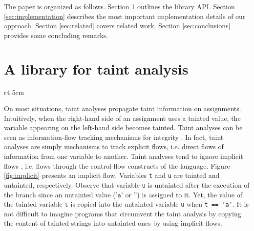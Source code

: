 \documentclass[oribibl]{llncs}
\begin{document}
  

 
The paper is organized as follows.
Section \ref{sec:library} outlines the library API.
Section \ref{sec:implementation} 
describes the most important implementation details of our approach.
Section \ref{sec:related} covers related work.  
Section \ref{sec:conclusions} provides some 
concluding remarks. 






\section{A library for taint analysis}
\label{sec:library}

\begin{wrapfigure}{r}{4.5cm}
\vspace{-30pt}
{\small{

\caption{\label{fig:implicit}An implicit flow}
}}
\vspace{-20pt}
\end{wrapfigure}



On most situations, taint analyses %
propagate 
taint information on assignments.  
Intuitively, when the right-hand side of an assignment uses a tainted value, 
the variable appearing on the left-hand side becomes tainted.
Taint analyses can be seen as information-flow tracking 
mechanisms for integrity \cite{Sabelfeld:Myers:JSAC}. 
In fact, taint analyses are simply mechanisms to 
track explicit flows, i.e. direct flows of information 
from one variable to another. 
Taint analyses tend to ignore 
implicit flows \cite{Denning:Denning:Certification}, i.e. 
flows through the control-flow constructs of the language. 
Figure \ref{fig:implicit} presents an implicit 
flow. Variables \texttt{t} and \texttt{u} are 
tainted and untainted, respectively.
Observe that variable \texttt{u} 
is untainted after the execution of the branch since 
an untainted value ($\texttt{'a'}$ or
$\texttt{''}$) is assigned to it. Yet, the value of the tainted variable 
$\texttt{t}$ is copied into the untainted variable 
\texttt{u} when \texttt{t == 'a'}. 
It is not difficult to imagine 
programs that circumvent the taint analysis by
copying the content of tainted strings 
into untainted ones  by using implicit flows\cite{Russo:IOS}.
\end{document}
